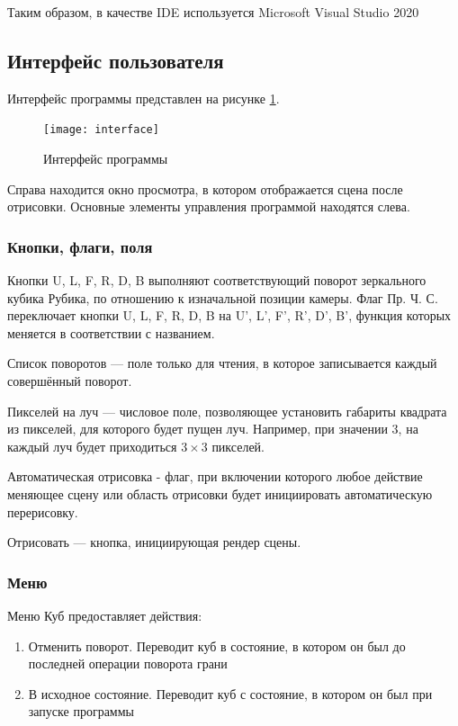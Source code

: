 Таким образом, в качестве IDE используется Microsoft Visual Studio 2020

\subsection{Интерфейс пользователя}
Интерфейс программы представлен на рисунке \ref{fig:interface}.

\begin{figure}[ht]
	\centering
	\texttt{[image: interface]}
	\caption{Интерфейс программы}
	\label{fig:interface}
\end{figure}

Справа находится окно просмотра, в котором отображается сцена после отрисовки. Основные элементы управления программой находятся слева.

\subsubsection{Кнопки, флаги, поля}
Кнопки U, L, F, R, D, B выполняют соответствующий поворот зеркального кубика Рубика, по отношению к изначальной позиции камеры. Флаг Пр. Ч. С. переключает кнопки U, L, F, R, D, B на U', L', F', R', D', B', функция которых меняется в соответствии с названием.

Список поворотов --- поле только для чтения, в которое записывается каждый совершённый поворот.

Пикселей на луч --- числовое поле, позволяющее установить габариты квадрата из пикселей, для которого будет пущен луч. Например, при значении 3, на каждый луч будет приходиться $3\times 3$ пикселей.

Автоматическая отрисовка - флаг, при включении которого любое действие меняющее сцену или область отрисовки будет инициировать автоматическую перерисовку.

Отрисовать --- кнопка, инициирующая рендер сцены.

\subsubsection{Меню}
Меню Куб предоставляет действия:
\begin{enumerate}
\item Отменить поворот. Переводит куб в состояние, в котором он был до последней операции поворота грани
\item В исходное состояние. Переводит куб с состояние, в котором он был при запуске программы
\end{enumerate}

